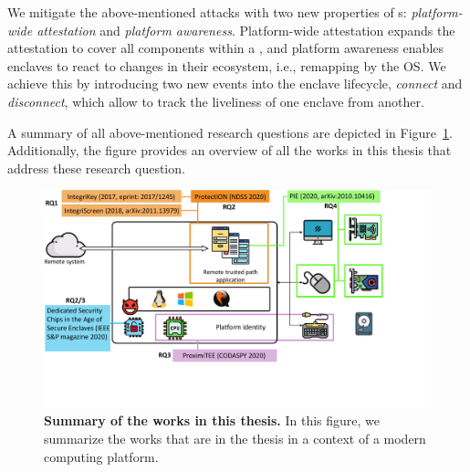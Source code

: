 We mitigate the above-mentioned attacks with two new properties of \nameenclave{}s: \emph{platform-wide attestation} and \emph{platform awareness}. Platform-wide attestation expands the attestation to cover all components within a \nameenclave, and platform awareness enables enclaves to react to changes in their ecosystem, i.e., remapping by the OS.
We achieve this by introducing two new events into the enclave lifecycle, \textit{connect} and \textit{disconnect}, which allow to track the liveliness of one enclave from another.


A summary of all above-mentioned research questions are depicted in Figure~\ref{fig:works}. Additionally, the figure provides an overview of all the works in this thesis that address these research question.

\begin{figure}[t]
  \centering
    \includegraphics[trim={0 3cm 4cm 0},clip,width=\linewidth]{chapters/introduction/images/works.pdf}
    \caption[Summary of the works in this thesis]{\textbf{Summary of the works in this thesis.} In this figure, we summarize the works that are in the thesis in a context of a modern computing platform.}
    \label{fig:works}
\end{figure}